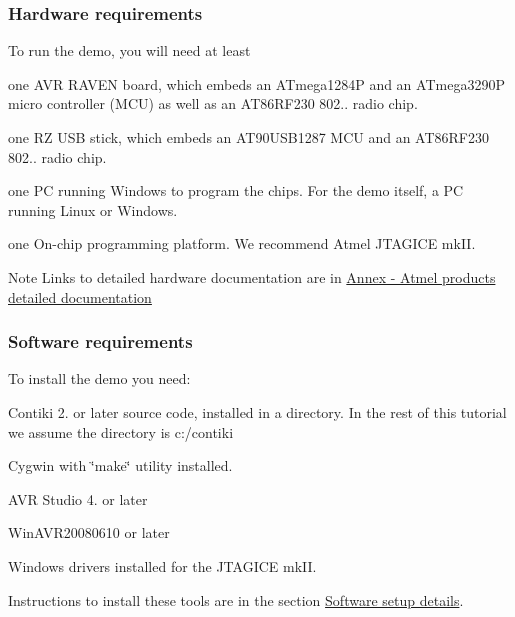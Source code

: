  \hypertarget{a00058_hardware}{}\subsubsection{\-Hardware requirements}\label{a00058_hardware}
\-To run the demo, you will need at least \begin{DoxyItemize}
\item one \-A\-V\-R \-R\-A\-V\-E\-N board, which embeds an \-A\-Tmega1284\-P and an \-A\-Tmega3290\-P micro controller (\-M\-C\-U) as well as an \-A\-T86\-R\-F230 802.. radio chip. \item one \-R\-Z \-U\-S\-B stick, which embeds an \-A\-T90\-U\-S\-B1287 \-M\-C\-U and an \-A\-T86\-R\-F230 802.. radio chip. \item one \-P\-C running \-Windows to program the chips. \-For the demo itself, a \-P\-C running \-Linux or \-Windows. \item one \-On-\/chip programming platform. \-We recommend \-Atmel \-J\-T\-A\-G\-I\-C\-E mk\-I\-I.\end{DoxyItemize}
\begin{DoxyNote}{\-Note}
\-Links to detailed hardware documentation are in \hyperlink{a00058_annex_hardware}{\-Annex -\/ \-Atmel products detailed documentation}
\end{DoxyNote}


 \hypertarget{a00058_software}{}\subsubsection{\-Software requirements}\label{a00058_software}
\-To install the demo you need\-: \begin{DoxyItemize}
\item \-Contiki 2. or later source code, installed in a directory. \-In the rest of this tutorial we assume the directory is c\-:/contiki \item \-Cygwin with \char`\"{}make\char`\"{} utility installed. \item \-A\-V\-R \-Studio 4. or later \item \-Win\-A\-V\-R20080610 or later \item \-Windows drivers installed for the \-J\-T\-A\-G\-I\-C\-E mk\-I\-I.\end{DoxyItemize}
\-Instructions to install these tools are in the section \hyperlink{a00058_annex_software}{\-Software setup details}.\par


